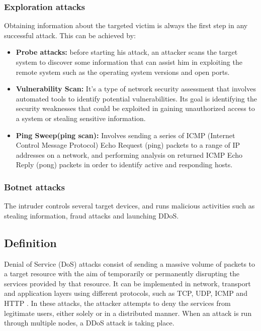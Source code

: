 \subsubsection{Exploration attacks}
Obtaining information about the targeted victim is always the first step in any successful attack. This can be achieved by:
\begin{itemize}
    \item \textbf{Probe attacks:} before starting his attack, an attacker scans the target system to discover some information that can assist him in exploiting the remote system such as the operating system versions and open ports.
    \item \textbf{Vulnerability Scan: }It's a type of network security assessment that involves automated tools to identify potential vulnerabilities. Its goal is identifying the security weaknesses that could be exploited in gaining unauthorized access to a system or stealing sensitive information.
   \item \textbf{Ping Sweep(ping scan):} Involves sending a series of ICMP (Internet Control Message Protocol) Echo Request (ping) packets to a range of IP addresses on a network, and performing analysis on returned ICMP Echo Reply (pong) packets in order to identify active and responding hosts.
\end{itemize}

\subsubsection{Botnet attacks}
The intruder controls several target devices, and runs malicious activities such as stealing information, fraud attacks and launching DDoS.


\subsection{Definition}

Denial of Service (DoS) attacks consist of sending a massive volume of packets to a target resource with the aim of temporarily or permanently disrupting the services provided by that resource. It can be implemented in network, transport and application layers using different protocols, such as TCP, UDP, ICMP and HTTP \cite{ddos2019}. In these attacks, the attacker attempts to deny the services from legitimate users, either solely or in a distributed manner. When an attack is run through multiple nodes, a DDoS attack is taking place.




